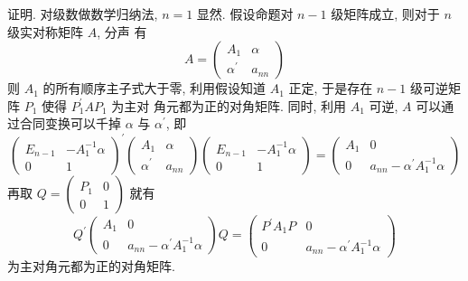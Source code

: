 \documentclass{article}
\begin{document}
{\heiti 证明.} 对级数做数学归纳法, $n=1$ 显然. 假设命题对 $n-1$ 级矩阵成立, 则对于 $n$ 级实对称矩阵 $A$, 分声
有
\begin{equation*}
    A=\left(\begin{array}{cc}
        A_{1}           & \alpha  \\
        \alpha^{\prime} & a_{n n}
    \end{array}\right)
\end{equation*}
则 $A_{1}$ 的所有顺序主子式大于零, 利用假设知道 $A_{1}$ 正定, 于是存在 $n-1$ 级可逆矩阵 $P_{1}$ 使得 $P_{1}^{\prime} A P_{1}$ 为主对 角元都为正的对角矩阵. 同时, 利用 $A_{1}$ 可逆, $A$ 可以通过合同变换可以千掉 $\alpha$ 与 $\alpha^{\prime}$, 即
\begin{equation*}
    \left(\begin{array}{cc}
        E_{n-1} & -A_{1}^{-1} \alpha \\
        0       & 1
    \end{array}\right)^{\prime}\left(\begin{array}{cc}
            A_{1}           & \alpha  \\
            \alpha^{\prime} & a_{n n}
        \end{array}\right)\left(\begin{array}{cc}
            E_{n-1} & -A_{1}^{-1} \alpha \\
            0       & 1
        \end{array}\right)=\left(\begin{array}{cc}
            A_{1} & 0                                         \\
            0     & a_{n n}-\alpha^{\prime} A_{1}^{-1} \alpha
        \end{array}\right)
\end{equation*}
再取 $Q=\left(\begin{array}{cc}P_{1} & 0 \\ 0 & 1\end{array}\right)$ 就有
\begin{equation*}
    Q^{\prime}\left(\begin{array}{cc}
            A_{1} & 0                                         \\
            0     & a_{n n}-\alpha^{\prime} A_{1}^{-1} \alpha
        \end{array}\right) Q=\left(\begin{array}{cc}
            P^{\prime} A_{1} P & 0                                         \\
            0                  & a_{n n}-\alpha^{\prime} A_{1}^{-1} \alpha
        \end{array}\right)
\end{equation*}
为主对角元都为正的对角矩阵.
\end{document}
